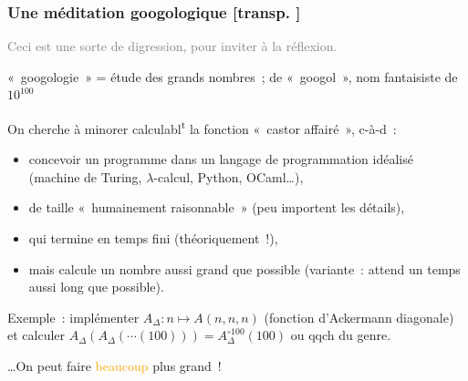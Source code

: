 \documentclass[mathserif,a4paper,aspectratio=169]{beamer}
\renewcommand{\frametitle}[1]{\subsubsection*{#1 {\footnotesize[transp. \insertframenumber]}}}
\begin{document}
\begin{frame}
\frametitle{Une méditation googologique}

{\footnotesize\textcolor{gray}{Ceci est une sorte de digression, pour
    inviter à la réflexion.}\par}

\medskip

{\footnotesize « googologie » = étude des grands nombres ; de
  « googol », nom fantaisiste de $10^{100}$\par}

\bigskip

On cherche à minorer calculabl\textsuperscript{t} la fonction « castor
affairé », c-à-d :
\begin{itemize}
\item concevoir un programme dans un langage de programmation idéalisé
  (machine de Turing, $\lambda$-calcul, Python, OCaml…),
\item de taille « humainement raisonnable » (peu importent les détails),
\item qui \alert{termine en temps fini} (théoriquement !),
\item mais calcule un nombre aussi grand que possible (variante :
  attend un temps aussi long que possible).
\end{itemize}

\bigskip

Exemple : implémenter $A_\Delta\colon n \mapsto A(n,n,n)$ (fonction
d'Ackermann diagonale) et calculer $A_\Delta(A_\Delta(\cdots(100))) =
A_\Delta^{\circ 100}(100)$ ou qqch du genre.

…On peut faire \textcolor{orange}{beaucoup} plus grand !

\end{frame}
%
%
\end{document}
